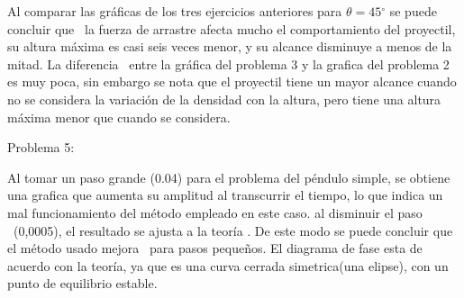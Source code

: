 \documentclass{article}
\begin{document}
Al comparar las gr\'{a}ficas de los tres ejercicios anteriores para $\theta=45%
{{}^\circ}%
$ se puede concluir que \ la fuerza de arrastre afecta mucho el comportamiento
del proyectil, su altura m\'{a}xima es casi seis veces menor, y su alcance
disminuye a menos de la mitad. La diferencia \ entre la gr\'{a}fica del
problema 3 y la grafica del problema 2 es muy poca, sin embargo se nota que el
proyectil tiene un mayor alcance cuando no se considera la variaci\'{o}n de la
densidad con la altura, pero tiene una altura m\'{a}xima menor que cuando se considera.

\newline Problema 5:

Al tomar un paso grande (0.04) para el problema del p\'{e}ndulo simple, se
obtiene una grafica que aumenta su amplitud al transcurrir el tiempo, lo que
indica un mal funcionamiento del m\'{e}todo empleado en este caso. al
disminuir el paso \ (0,0005), el resultado se ajusta a la teor\'{i}a . De este
modo se puede concluir que el m\'{e}todo usado mejora \ para pasos
peque\~{n}os. El diagrama de fase esta de acuerdo con la teor\'{i}a, ya que es
una curva cerrada simetrica(una elipse), con un punto de equilibrio estable.

\bigskip
\end{document}
